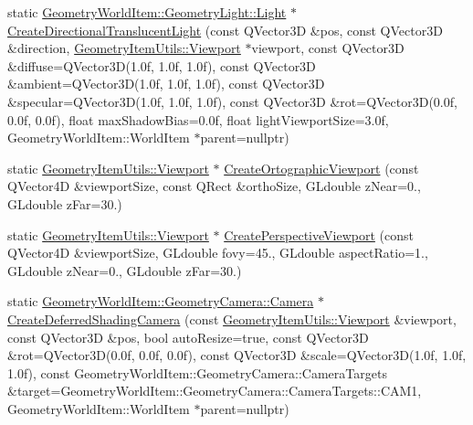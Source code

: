 \begin{DoxyCompactItemize}
\item 
static \mbox{\hyperlink{class_geometry_engine_1_1_geometry_world_item_1_1_geometry_light_1_1_light}{Geometry\+World\+Item\+::\+Geometry\+Light\+::\+Light}} $\ast$ \mbox{\hyperlink{class_geometry_engine_1_1_geometry_factory_a04236d5c1796b70fd5d72c55a0eedf5f}{Create\+Directional\+Translucent\+Light}} (const Q\+Vector3D \&pos, const Q\+Vector3D \&direction, \mbox{\hyperlink{class_geometry_engine_1_1_geometry_item_utils_1_1_viewport}{Geometry\+Item\+Utils\+::\+Viewport}} $\ast$viewport, const Q\+Vector3D \&diffuse=Q\+Vector3D(1.\+0f, 1.\+0f, 1.\+0f), const Q\+Vector3\+D \&ambient=\+Q\+Vector3\+D(1.\+0f, 1.\+0f, 1.\+0f), const Q\+Vector3\+D \&specular=\+Q\+Vector3\+D(1.\+0f, 1.\+0f, 1.\+0f), const Q\+Vector3\+D \&rot=\+Q\+Vector3\+D(0.\+0f, 0.\+0f, 0.\+0f), float max\+Shadow\+Bias=0.\+0f, float light\+Viewport\+Size=3.\+0f, Geometry\+World\+Item\+::\+World\+Item $\ast$parent=nullptr)
\item 
static \mbox{\hyperlink{class_geometry_engine_1_1_geometry_item_utils_1_1_viewport}{Geometry\+Item\+Utils\+::\+Viewport}} $\ast$ \mbox{\hyperlink{class_geometry_engine_1_1_geometry_factory_a27855bee8a087a66034ee5001a023241}{Create\+Ortographic\+Viewport}} (const Q\+Vector4D \&viewport\+Size, const Q\+Rect \&ortho\+Size, G\+Ldouble z\+Near=0., G\+Ldouble z\+Far=30.)
\item 
static \mbox{\hyperlink{class_geometry_engine_1_1_geometry_item_utils_1_1_viewport}{Geometry\+Item\+Utils\+::\+Viewport}} $\ast$ \mbox{\hyperlink{class_geometry_engine_1_1_geometry_factory_ab29bf1ed42ffb4054a8d19c292bcbaea}{Create\+Perspective\+Viewport}} (const Q\+Vector4D \&viewport\+Size, G\+Ldouble fovy=45., G\+Ldouble aspect\+Ratio=1., G\+Ldouble z\+Near=0., G\+Ldouble z\+Far=30.)
\item 
static \mbox{\hyperlink{class_geometry_engine_1_1_geometry_world_item_1_1_geometry_camera_1_1_camera}{Geometry\+World\+Item\+::\+Geometry\+Camera\+::\+Camera}} $\ast$ \mbox{\hyperlink{class_geometry_engine_1_1_geometry_factory_ac6b3dc56e3cc3ce41a0b1e8d95566d75}{Create\+Deferred\+Shading\+Camera}} (const \mbox{\hyperlink{class_geometry_engine_1_1_geometry_item_utils_1_1_viewport}{Geometry\+Item\+Utils\+::\+Viewport}} \&viewport, const Q\+Vector3D \&pos, bool auto\+Resize=true, const Q\+Vector3D \&rot=Q\+Vector3D(0.\+0f, 0.\+0f, 0.\+0f), const Q\+Vector3\+D \&scale=\+Q\+Vector3\+D(1.\+0f, 1.\+0f, 1.\+0f), const Geometry\+World\+Item\+::\+Geometry\+Camera\+::\+Camera\+Targets \&target=\+Geometry\+World\+Item\+::\+Geometry\+Camera\+::\+Camera\+Targets\+::\+C\+A\+M1, Geometry\+World\+Item\+::\+World\+Item $\ast$parent=nullptr)

\end{DoxyCompactItemize}
